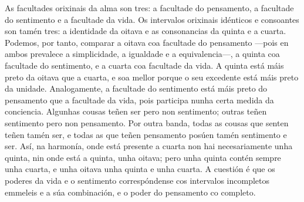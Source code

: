 As facultades orixinais da alma son tres: a facultade do pensamento, a facultade do sentimento e a facultade da vida. Os intervalos orixinais idénticos e consoantes son tamén tres: a identidade da oitava e as consonancias da quinta e a cuarta. Podemos, por tanto, comparar a oitava coa facultade do pensamento —pois en ambos prevalece a simplicidade, a igualdade e a equivalencia—, a quinta coa facultade do sentimento, e a cuarta coa facultade da vida. A quinta está máis preto da oitava que a cuarta, e soa mellor porque o seu excedente está máis preto da unidade. Analogamente, a facultade do sentimento está máis preto do pensamento que a facultade da vida, pois participa nunha certa medida da conciencia. Algunhas cousas teñen ser pero non sentimento; outras teñen sentimento pero non pensamento. Por outra banda, todas as cousas que senten teñen tamén ser, e todas as que teñen pensamento posúen tamén sentimento e ser. Así, na harmonía, onde está presente a cuarta non hai necesariamente unha quinta, nin onde está a quinta, unha oitava; pero unha quinta contén sempre unha cuarta, e unha oitava unha quinta e unha cuarta. A cuestión é que os poderes da vida e o sentimento correspóndense cos intervalos incompletos emmeleis e a súa combinación, e o poder do pensamento co completo.
